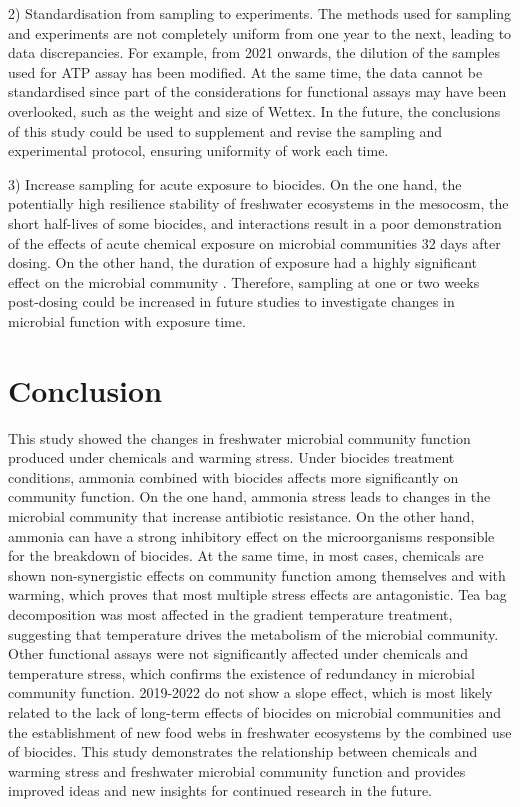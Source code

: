 \documentclass[11pt, a4paper]{article}
\begin{document}
\begin{spacing}{1.5}
2)	Standardisation from sampling to experiments. The methods used for sampling and experiments are not completely uniform from one year to the next, leading to data discrepancies. For example, from 2021 onwards, the dilution of the samples used for ATP assay has been modified. At the same time, the data cannot be standardised since part of the considerations for functional assays may have been overlooked, such as the weight and size of Wettex. In the future, the conclusions of this study could be used to supplement and revise the sampling and experimental protocol, ensuring uniformity of work each time.

3)	Increase sampling for acute exposure to biocides. On the one hand, the potentially high resilience stability of freshwater ecosystems in the mesocosm, the short half-lives of some biocides, and interactions result in a poor demonstration of the effects of acute chemical exposure on microbial communities 32 days after dosing. On the other hand, the duration of exposure had a highly significant effect on the microbial community \citep{ding2010effect}. Therefore, sampling at one or two weeks post-dosing could be increased in future studies to investigate changes in microbial function with exposure time.

\section{Conclusion}

This study showed the changes in freshwater microbial community function produced under chemicals and warming stress. Under biocides treatment conditions, ammonia combined with biocides affects more significantly on community function. On the one hand, ammonia stress leads to changes in the microbial community that increase antibiotic resistance. On the other hand, ammonia can have a strong inhibitory effect on the microorganisms responsible for the breakdown of biocides. At the same time, in most cases, chemicals are shown non-synergistic effects on community function among themselves and with warming, which proves that most multiple stress effects are antagonistic. Tea bag decomposition was most affected in the gradient temperature treatment, suggesting that temperature drives the metabolism of the microbial community. Other functional assays were not significantly affected under chemicals and temperature stress, which confirms the existence of redundancy in microbial community function. 2019-2022 do not show a slope effect, which is most likely related to the lack of long-term effects of biocides on microbial communities and the establishment of new food webs in freshwater ecosystems by the combined use of biocides. This study demonstrates the relationship between chemicals and warming stress and freshwater microbial community function and provides improved ideas and new insights for continued research in the future.


\end{spacing}
\end{document}
